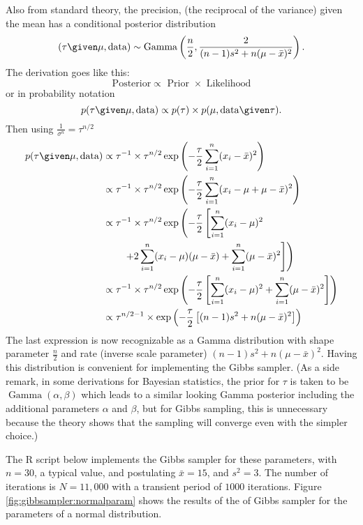 \documentclass[12pt]{article}
\begin{document}
Also from standard theory, the precision, (the reciprocal of the
variance) given the mean has a conditional posterior distribution
\[
    (\tau \given \mu, \text{data}) \sim
    \operatorname{Gamma}
    \left( \frac{n}{2}, \frac{2}{(n-1) s^2 + n (\mu - \bar{x})^2} \right).
\] The derivation goes like this:
\[
    \text{ Posterior} \propto \text{ Prior } \times \text{ Likelihood }
\] or in probability notation
\[
    p(\tau \given \mu, \text{data} ) \propto p(\tau) \times p( \mu,
    \text{data} \given \tau).
\] Then using \( \frac{1}{\sigma^n} = \tau^{n/2} \)
\begin{align*}
    p(\tau \given \mu, \text{data} ) &\propto \tau^{-1} \times \tau^{n/2}
    \exp \left( -\frac{\tau}{2} \sum\limits_{i=1}^n (x_i - \bar{x})^2
    \right) \\
    & \propto \tau^{-1} \times \tau^{n/2} \exp \left( -\frac{\tau}{2}
    \sum\limits_{i=1}^n (x_i - \mu + \mu - \bar{x})^2 \right) \\
    & \propto \tau^{-1} \times \tau^{n/2} \exp \left( -\frac{\tau}{2}
      \left[ \sum\limits_{i=1}^n (x_i - \mu)^2 \right. \right. \\
    & \qquad \left. \left. +2 \sum\limits_{i=1}^n (x_i
    - \mu)(\mu - \bar{x}) + \sum\limits_{i=1}^n (\mu - \bar{x})^2 \right]
    \right) \\
    & \propto \tau^{-1} \times \tau^{n/2} \exp \left( -\frac{\tau}{2}
    \left[ \sum\limits_{i=1}^n (x_i - \mu)^2 + \sum\limits_{i=1}^n (\mu
    - \bar{x})^2 \right] \right) \\
    & \propto \tau^{n/2-1} \times \exp \left( -\frac{\tau}{2} \left[(n-1)
    s^2 + n(\mu - \bar{x})^2 \right] \right) \\
\end{align*}
The last
expression is now recognizable as a Gamma distribution with shape
parameter \( \frac{n}{2} \) and rate (inverse scale parameter) \(
(n-1) s^2 + n(\mu - \bar{x})^2 \). Having this distribution is
convenient for implementing the Gibbs sampler.  (As a side remark, in
some derivations for Bayesian statistics, the prior for \( \tau
\) is taken to be \(
\operatorname{Gamma}
(\alpha, \beta) \) which leads to a similar looking Gamma posterior
including the additional parameters \( \alpha \) and \( \beta \), but
for Gibbs sampling, this is unnecessary because the theory shows that
the sampling will converge even with the simpler choice.) 

The R script below implements the Gibbs sampler for these parameters,
with \( n = 30 \), a typical value, and postulating \( \bar{x} = 15 \),
and \( s^2 = 3 \).  The number of iterations is \( N = 11{,}000 \) with
a transient period of \( 1000 \) iterations. Figure~%
\ref{fig:gibbsampler:normalparam} shows the results of the of Gibbs
sampler for the parameters of a normal distribution.
\end{document}
